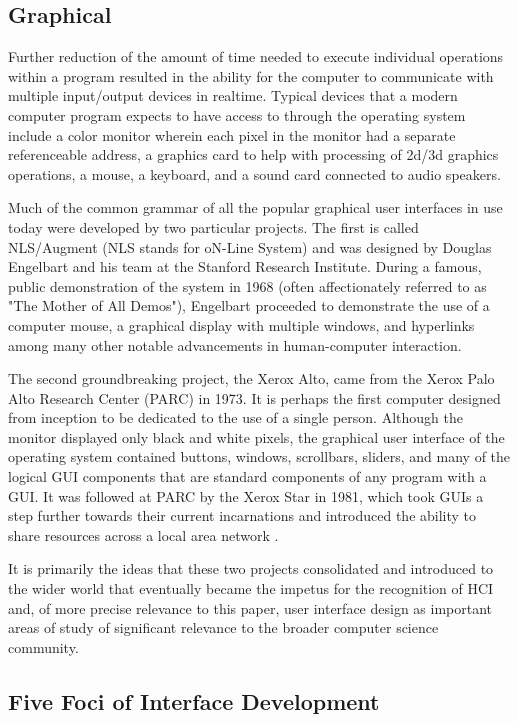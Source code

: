 \subsection{Graphical}

Further reduction of the amount of time needed to execute individual operations within a program resulted in the ability for the computer to communicate with multiple input/output devices in realtime. Typical devices that a modern computer program expects to have access to through the operating system include a color monitor wherein each pixel in the monitor had a separate referenceable address, a graphics card to help with processing of 2d/3d graphics operations, a mouse, a keyboard, and a sound card connected to audio speakers.

Much of the common grammar of all the popular graphical user interfaces in use today were developed by two particular projects. The first is called NLS/Augment (NLS stands for oN-Line System) and was designed by Douglas Engelbart and his team at the Stanford Research Institute. During a famous, public demonstration of the system in 1968 (often affectionately referred to as "The Mother of All Demos"), Engelbart proceeded to demonstrate the use of a computer mouse, a graphical display with multiple windows, and hyperlinks among many other notable advancements in human-computer interaction. 

The second groundbreaking project, the Xerox Alto, came from the Xerox Palo Alto Research Center (PARC) in 1973. It is perhaps the first computer designed from inception to be dedicated to the use of a single person. Although the monitor displayed only black and white pixels, the graphical user interface of the operating system contained buttons, windows, scrollbars, sliders, and many of the logical GUI components that are standard components of any program with a GUI. It was followed at PARC by the Xerox Star in 1981, which took GUIs a step further towards their current incarnations and introduced the ability to share resources across a local area network \cite{xeroxstar1989}.

It is primarily the ideas that these two projects consolidated and introduced to the wider world that eventually became the impetus for the recognition of HCI and, of more precise relevance to this paper, user interface design as important areas of study of significant relevance to the broader computer science community. 

\subsection{Five Foci of Interface Development}

